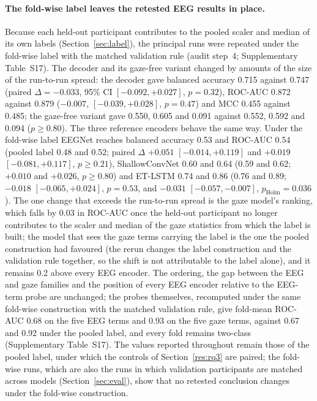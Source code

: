\documentclass[pdflatex,sn-basic,Numbered,twocolumn,iicol]{sn-jnl}
\theoremstyle{thmstyleone}%
\theoremstyle{thmstyletwo}%
\theoremstyle{thmstylethree}%
\begin{document}
\paragraph{The fold-wise label leaves the retested EEG results in place.} Because each held-out participant contributes to the pooled scaler and median of its own labels (Section~\ref{sec:label}), the principal runs were repeated under the fold-wise label with the matched validation rule (audit step~4; Supplementary Table~S17). The decoder and its gaze-free variant changed by amounts of the size of the run-to-run spread: the decoder gave balanced accuracy 0.715 against 0.747 (paired $\Delta=-0.033$, 95\% CI $[-0.092, +0.027]$, $p=0.32$), ROC-AUC 0.872 against 0.879 ($-0.007$, $[-0.039, +0.028]$, $p=0.47$) and MCC 0.455 against 0.485; the gaze-free variant gave 0.550, 0.605 and 0.091 against 0.552, 0.592 and 0.094 ($p\ge0.80$). The three reference encoders behave the same way. Under the fold-wise label EEGNet reaches balanced accuracy 0.53 and ROC-AUC 0.54 (pooled label 0.48 and 0.52; paired $\Delta$ $+0.051$ $[-0.014, +0.119]$ and $+0.019$ $[-0.081, +0.117]$, $p\ge0.21$), ShallowConvNet 0.60 and 0.64 (0.59 and 0.62; $+0.010$ and $+0.026$, $p\ge0.80$) and ET-LSTM 0.74 and 0.86 (0.76 and 0.89; $-0.018$ $[-0.065, +0.024]$, $p=0.53$, and $-0.031$ $[-0.057, -0.007]$, $p_{\mathrm{Holm}}=0.036$). The one change that exceeds the run-to-run spread is the gaze model's ranking, which falls by 0.03 in ROC-AUC once the held-out participant no longer contributes to the scaler and median of the gaze statistics from which the label is built; the model that sees the gaze terms carrying the label is the one the pooled construction had favoured (the rerun changes the label construction and the validation rule together, so the shift is not attributable to the label alone), and it remains 0.2 above every EEG encoder. The ordering, the gap between the EEG and gaze families and the position of every EEG encoder relative to the EEG-term probe are unchanged; the probes themselves, recomputed under the same fold-wise construction with the matched validation rule, give fold-mean ROC-AUC 0.68 on the five EEG terms and 0.93 on the five gaze terms, against 0.67 and 0.92 under the pooled label, and every fold remains two-class (Supplementary Table~S17). The values reported throughout remain those of the pooled label, under which the controls of Section~\ref{res:rq3} are paired; the fold-wise runs, which are also the runs in which validation participants are matched across models (Section~\ref{sec:eval}), show that no retested conclusion changes under the fold-wise construction.
\end{document}
